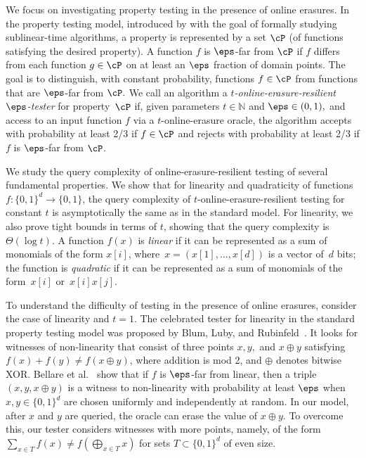 \documentclass[11pt]{article}
\numberwithin{equation}{section}
\theoremstyle{definition}
\theoremstyle{plain}
\begin{document}
We focus on investigating property testing in the presence of online erasures. In the property testing model, introduced by \cite{RubinfeldS96,GGR98} with the goal of formally studying sublinear-time algorithms, a property is represented by a set  $\cP$ (of functions satisfying the desired property).  A function $f$ is $\eps$-far from $\cP$ if $f$ differs from each function $g\in\cP$ on at least an $\eps$ fraction of domain points. 
The goal is to distinguish, with constant probability, functions $f\in\cP$ from functions that are $\eps$-far from $\cP.$
We call an algorithm a {\em $t$-online-erasure-resilient $\eps$-tester} for property~$\cP$ if, given parameters $t\in\mathbb{N}$ and $\eps\in(0,1),$ and access to an input function $f$ via a $t$-online-erasure oracle, the algorithm accepts with probability at least 2/3 if $f\in\cP$ and rejects with probability at least 2/3 if $f$ is $\eps$-far from $\cP$.

We study the query complexity of online-erasure-resilient testing of several fundamental properties. 
We show that for linearity and quadraticity of functions $f:\{0,1\}^d\to\{0,1\}$, the query complexity of $t$-online-erasure-resilient testing for constant $t$ is asymptotically the same as in the standard model. For linearity, we also prove tight bounds in terms of $t$, showing that the query complexity is $\Theta(\log t)$.
A function $f(x)$ is {\em linear} if it can be represented as a sum of monomials of the form $x[i]$, where~$x=(x[1],\dots,x[d])$ is a vector of~$d$ bits; the function is {\em quadratic} if it can be represented as a sum of monomials of the form~$x[i]$ or~$x[i]x[j]$.



To understand
the difficulty of testing in the presence of online erasures, consider the case of linearity and $t=1.$ The celebrated tester for linearity in the standard property testing model was proposed by
Blum, Luby, and Rubinfeld~\cite{BlumLR93}. It looks for witnesses of non-linearity that consist of three points $x,y,$ and $x\oplus y$ satisfying $f(x)+f(y)\neq f(x\oplus y)$, where addition is mod 2, and $\oplus$ denotes bitwise XOR. 
Bellare et al.~\cite{BellareCHKS96} show that if $f$ is $\eps$-far from linear, then a triple $(x,y, x\oplus y)$ is a witness to non-linearity with probability at least $\eps$ when $x,y\in\{0,1\}^d$ are chosen uniformly and independently at random. 
In our model, after $x$ and $y$ are queried, the oracle can erase the value of $x\oplus y.$ 
To overcome this, our tester considers witnesses with more points, namely, of the form $\sum_{x\in T}f(x) \neq f(\bigoplus_{x \in T}{x})$ for sets $T \subset \{0,1\}^d$ of even size.
\end{document}
